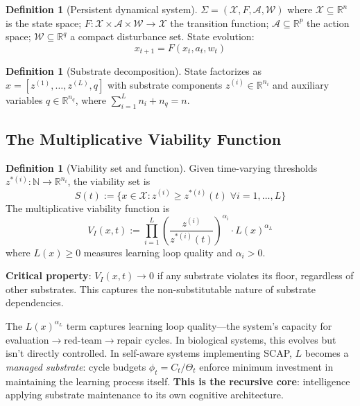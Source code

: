 \documentclass[11pt,a4paper]{article}
\theoremstyle{definition}
\newtheorem{definition}[theorem]{Definition}
\newcommand{\R}{\mathbb{R}}
\newcommand{\N}{\mathbb{N}}
\newcommand{\X}{\mathcal{X}}
\newcommand{\A}{\mathcal{A}}
\newcommand{\W}{\mathcal{W}}
\begin{document}
\begin{definition}[Persistent dynamical system]\label{def:system}
$\Sigma = (\X, F, \A, \W)$ where $\X \subseteq \R^n$ is the state space; $F : \X \times \A \times \W \to \X$ the transition function; $\A \subseteq \R^p$ the action space; $\W \subseteq \R^q$ a compact disturbance set. State evolution:
\begin{equation}
x_{t+1} = F(x_t, a_t, w_t)
\end{equation}
\end{definition}

\begin{definition}[Substrate decomposition]\label{def:substrate}
State factorizes as $x = [z^{(1)}, \ldots, z^{(L)}, q]$ with substrate components $z^{(i)} \in \R^{n_i}$ and auxiliary variables $q \in \R^{n_q}$, where $\sum_{i=1}^L n_i + n_q = n$.
\end{definition}

\subsection{The Multiplicative Viability Function}

\begin{definition}[Viability set and function]\label{def:viability}
Given time-varying thresholds $z^{*(i)} : \N \to \R^{n_i}$, the viability set is
\begin{equation}
S(t) := \{x \in \X : z^{(i)} \geq z^{*(i)}(t) \;\forall i = 1, \ldots, L\}
\end{equation}
The multiplicative viability function is
\begin{equation}
V_I(x, t) := \prod_{i=1}^L \left(\frac{z^{(i)}}{z^{*(i)}(t)}\right)^{\alpha_i} \cdot L(x)^{\alpha_L}
\end{equation}
where $L(x) \geq 0$ measures learning loop quality and $\alpha_i > 0$.
\end{definition}

\textbf{Critical property}: $V_I(x, t) \to 0$ if any substrate violates its floor, regardless of other substrates. This captures the non-substitutable nature of substrate dependencies.

The $L(x)^{\alpha_L}$ term captures learning loop quality---the system's capacity for evaluation$\to$red-team$\to$repair cycles. In biological systems, this evolves but isn't directly controlled. In self-aware systems implementing SCAP, $L$ becomes a \emph{managed substrate}: cycle budgets $\phi_t = C_t/\Theta_t$ enforce minimum investment in maintaining the learning process itself. \textbf{This is the recursive core}: intelligence applying substrate maintenance to its own cognitive architecture.
\end{document}
